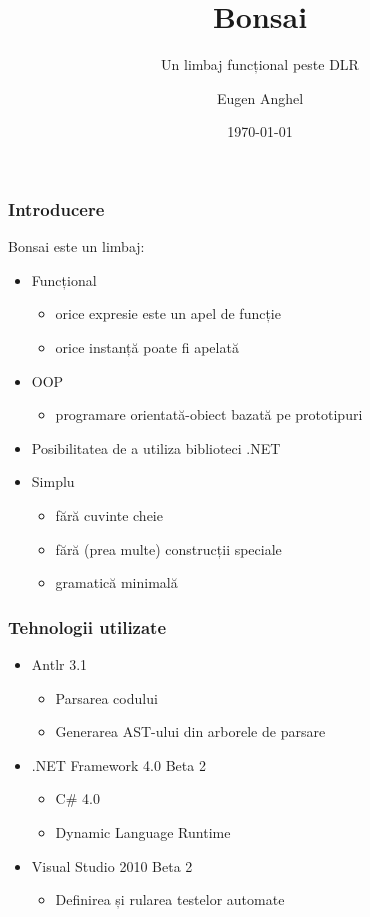 \documentclass{beamer}
\title[Bonsai - un limbaj funcțional peste DLR]{Bonsai}
\subtitle{Un limbaj funcțional peste DLR}
\author{Eugen Anghel}
\institute{Coordonator științific\\Profesor Doctor Gheorghe Grigoraș}
\date{\today}
\begin{document}
\frame{\titlepage}

\begin{frame}
  \frametitle{Introducere}
  Bonsai este un limbaj:
  \begin{itemize}
  \item 
    Funcțional
    \begin{itemize}
    \item orice expresie este un apel de funcție
    \item orice instanță poate fi apelată
    \end{itemize}
  \item 
    OOP
    \begin{itemize}
    \item programare orientată-obiect bazată pe prototipuri
    \end{itemize}
  \item
    Posibilitatea de a utiliza biblioteci .NET
  \item
    Simplu
    \begin{itemize}
    \item fără cuvinte cheie
    \item fără (prea multe) construcții speciale
    \item gramatică minimală
    \end{itemize}
  \end{itemize}
\end{frame}

\begin{frame}
  \frametitle{Tehnologii utilizate}
  \begin{itemize}
    \item 
      Antlr 3.1
      \begin{itemize}
      \item Parsarea codului
      \item Generarea AST-ului din arborele de parsare
      \end{itemize}
    \item
      .NET Framework 4.0 Beta 2
      \begin{itemize}
        \item C\# 4.0
        \item Dynamic Language Runtime
      \end{itemize}
    \item
      Visual Studio 2010 Beta 2
      \begin{itemize}
        \item Definirea și rularea testelor automate
      \end{itemize}
  \end{itemize}
\end{frame}
\end{document}
